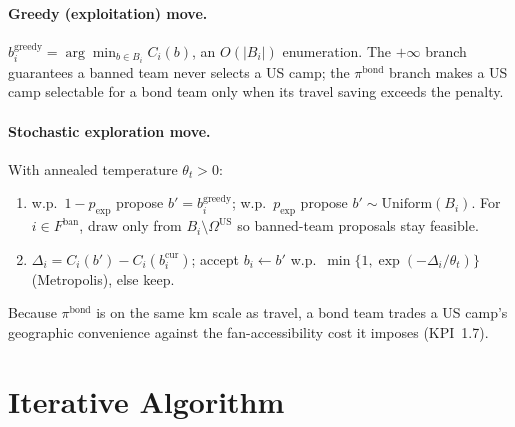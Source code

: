 \documentclass[12pt, letterpaper]{article}
\begin{document}
\paragraph{Greedy (exploitation) move.}
$b_i^{\mathrm{greedy}}=\arg\min_{b\in B_i} C_i(b)$, an $O(|B_i|)$
enumeration. The $+\infty$ branch guarantees a banned team never selects
a US camp; the $\pi^{\mathrm{bond}}$ branch makes a US camp selectable
for a bond team only when its travel saving exceeds the penalty.

\paragraph{Stochastic exploration move.}
With annealed temperature $\theta_t>0$:
\begin{enumerate}[leftmargin=*, itemsep=2pt]
  \item w.p.\ $1-p_{\mathrm{exp}}$ propose $b'=b_i^{\mathrm{greedy}}$;
        w.p.\ $p_{\mathrm{exp}}$ propose $b'\sim\mathrm{Uniform}(B_i)$.
        For $i\in F^{\mathrm{ban}}$, draw only from
        $B_i\setminus\Omega^{\mathrm{US}}$ so banned-team proposals stay
        feasible.
  \item $\Delta_i=C_i(b')-C_i(b_i^{\mathrm{cur}})$; accept
        $b_i\leftarrow b'$ w.p.\ $\min\{1,\exp(-\Delta_i/\theta_t)\}$
        (Metropolis), else keep.
\end{enumerate}
Because $\pi^{\mathrm{bond}}$ is on the same km scale as travel, a bond
team trades a US camp's geographic convenience against the
fan-accessibility cost it imposes (KPI~1.7).

\section{Iterative Algorithm}
\label{sec:algorithm}
\end{document}
